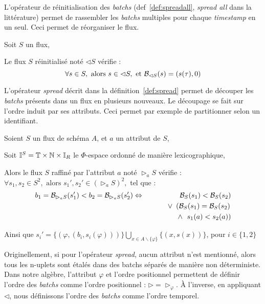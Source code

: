 L'opérateur de réinitialisation des \textit{batchs} (def~\ref{def:spreadall}, \textit{spread all} dans la littérature) permet de rassembler les \textit{batchs} multiples pour chaque \textit{timestamp} en un seul. Ceci permet de réorganiser le flux.
\begin{defi}\label{def:spreadall}
Soit $S$ un flux,

Le flux $S$ réinitialisé noté $\lhd S$ vérifie :
$$\forall s\in S, \textrm{ alors } s \in \lhd S, \textrm{ et }\mathcal{B}_{\lhd S}(s) = (s(\tau),0)$$
\end{defi}

L'opérateur \textit{spread} décrit dans la définition~\ref{def:spread} permet de découper les \textit{batchs} présents dans un flux en plusieurs nouveaux. Le découpage se fait sur l'ordre induit par ses attributs. Ceci permet par exemple de partitionner selon un identifiant.
\begin{defi}\label{def:spread}
Soient $S$ un flux de schéma $A$, et $a$ un attribut de $S$,

Soit $\mathbb{I}^S = \mathbb{T}\times\mathbb{N}\times \mathbb{I}_R$ le $\Phi$-espace ordonné de manière lexicographique,

Alors le flux $S$ raffiné par l'attribut $a$ noté $\rhd_{a} S$ vérifie :
$\forall s_1, s_2\in S^2, \textrm{ alors } s_1', s_2' \in (\rhd_a S)^2,$ tel que :
\begin{eqnarray*}
b_1=\mathcal{B}_{\rhd_a S}(s_1') < b_2=\mathcal{B}_{\rhd_a S}(s_2') &\Leftrightarrow & \mathcal{B}_S (s_1) < \mathcal{B}_S (s_2)\\ & & \quad \vee \ \left(\mathcal{B}_S (s_1) = \mathcal{B}_S (s_2)\right. \\ & & \quad\quad \quad\quad\wedge \ \left.s_1(a) < s_2(a)\right)
\end{eqnarray*}

Ainsi que $s_i' = \{(\varphi, (b_i,s_i(\varphi)))\}\bigcup_{x\in A\backslash\{\varphi\}}\{(x,s(x))\}$, pour $i\in\{1,2\}$
\end{defi}

Originellement, si pour l'opérateur \textit{spread}, aucun attribut n'est mentionné, alors tous les n-uplets sont étalés dans des batchs séparés de manière non déterministe. Dans notre algèbre, l'attribut $\varphi$ et l'ordre positionnel permettent de définir l'ordre des \textit{batchs} comme l'ordre positionnel : $\rhd = \rhd_\varphi$. À l'inverse, en appliquant $\lhd$, nous définissons l'ordre des \textit{batchs} comme l'ordre temporel.

